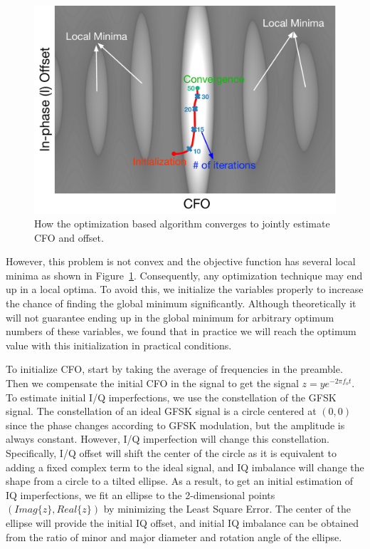 \begin{figure}
    \centering
    \includegraphics[width= \linewidth]{plots/algo_heatmap.pdf} 
    \caption{How the optimization based algorithm converges to jointly estimate CFO and \iq offset.}
    \label{fig:heatmap}
\end{figure}

However, this problem is not convex and the objective function has several local minima as shown in Figure~\ref{fig:heatmap}. Consequently, any optimization technique may end up in a local optima. To avoid this, we initialize the variables properly to increase the chance of finding the global minimum significantly. Although theoretically it will not guarantee ending up in the global minimum for arbitrary optimum numbers of these variables, we found that in practice we will reach the optimum value with this initialization in practical conditions. 

To initialize CFO, start by taking the average of frequencies in the preamble. Then we compensate the initial CFO in the signal to get the signal $z = y e^{-2\pi f_o t}$. To estimate initial I/Q imperfections, we use the \iq constellation of the GFSK signal. The \iq constellation of an ideal GFSK signal is a circle centered at $(0,0)$ since the phase changes according to GFSK modulation, but the amplitude is always constant. However, I/Q imperfection will change this constellation. Specifically, I/Q offset will shift the center of the circle as it is equivalent to adding a fixed complex term to the ideal signal, and IQ imbalance will change the shape from a circle to a tilted ellipse.
%
As a result, to get an initial estimation of IQ imperfections, we fit an ellipse to the 2-dimensional points $(Imag\{z\},Real\{z\})$ by minimizing the Least Square Error. The center of the ellipse will provide the initial IQ offset, and initial IQ imbalance can be obtained from the ratio of minor and major diameter and rotation angle of the ellipse.

